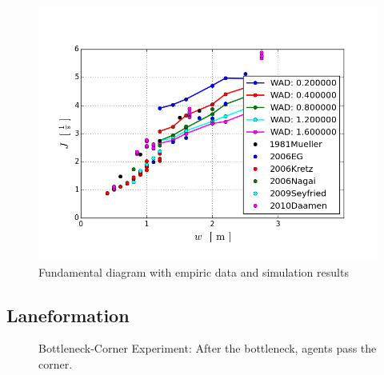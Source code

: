 \begin{figure}[h!]
\includegraphics[width=1.\textwidth]{pics/sim_flow_vs_experimental_data}
\caption{Fundamental diagram with empiric data and simulation results}
\label{funddiag}
\end{figure}
\subsection{Laneformation}
\begin{figure}[h!]
\caption{Bottleneck-Corner Experiment: After the bottleneck, agents pass the corner.}
\label{funddiag}
\end{figure}